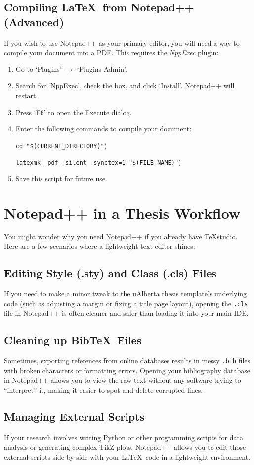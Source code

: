 		\subsection{Compiling \LaTeX\ from Notepad++ (Advanced)}
			If you wish to use Notepad++ as your primary editor, you will need a way to compile your document into a PDF. This requires the \textit{NppExec} plugin:
			\begin{enumerate}
				\item Go to `Plugins' $\rightarrow$ `Plugins Admin'.
				\item Search for `NppExec', check the box, and click `Install'. Notepad++ will restart.
				\item Press `F6' to open the Execute dialog.
				\item Enter the following commands to compile your document:\par
					\texttt{cd "\$(CURRENT\_DIRECTORY)"})\par
					\texttt{latexmk -pdf -silent -synctex=1 "\$(FILE\_NAME)"})
				\item Save this script for future use.
			\end{enumerate}
	
	\section{Notepad++ in a Thesis Workflow}
		You might wonder why you need Notepad++ if you already have TeXstudio. 
		Here are a few scenarios where a lightweight text editor shines:
		
		\subsection{Editing Style (.sty) and Class (.cls) Files}
			If you need to make a minor tweak to the uAlberta thesis template's underlying code (such as adjusting a margin or fixing a title page layout), opening the \texttt{.cls} file in Notepad++ is often cleaner and safer than loading it into your main IDE.
		
		\subsection{Cleaning up Bib\TeX\ Files}
			Sometimes, exporting references from online databases results in messy \texttt{.bib} files with broken characters or formatting errors. 
			Opening your bibliography database in Notepad++ allows you to view the raw text without any software trying to \enquote{interpret} it, making it easier to spot and delete corrupted lines.
		
		\subsection{Managing External Scripts}
			If your research involves writing Python or other programming scripts for data analysis or generating complex TikZ plots, Notepad++ allows you to edit those external scripts side-by-side with your \LaTeX\ code in a lightweight environment.
